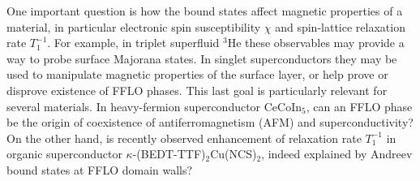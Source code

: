 \documentclass[prb,aps,showpacs,amsmath,twocolumn,10pt]{revtex4-1}
\newcommand{\cecoin}{CeCoIn$_5$}
\newcommand{\kbtf}{$\kappa$-(BEDT-TTF)$_2$Cu(NCS)$_2$}
\begin{document}
One important question is how the bound states affect magnetic properties of a material, in particular 
electronic spin susceptibility $\chi$ and spin-lattice relaxation rate $T_1^{-1}$. 
For example, in triplet superfluid $^3$He these observables may provide a way to probe 
surface Majorana states.\cite{Nagato:2009chi,Chung:2009t1}
In singlet superconductors they may be used to manipulate magnetic properties of 
the surface layer, or help prove or disprove existence of FFLO phases. 
This last goal is particularly relevant for several materials. 
In heavy-fermion superconductor \cecoin, can an FFLO phase be the origin of 
coexistence\cite{cecoin5_Kenzelmann,cecoin5_Kenzelmann2,Gerber2014} of antiferromagnetism (AFM) and superconductivity?
%
%
On the other hand, is recently observed\cite{Mayaffre2014} enhancement of relaxation rate $T_1^{-1}$ 
in organic superconductor \kbtf, indeed explained by Andreev bound states at FFLO domain walls?  
\end{document}
